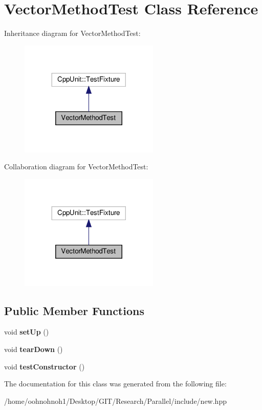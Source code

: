 \hypertarget{classVectorMethodTest}{}\section{Vector\+Method\+Test Class Reference}
\label{classVectorMethodTest}


Inheritance diagram for Vector\+Method\+Test\+:\nopagebreak
\begin{figure}[H]
\begin{center}
\leavevmode
\includegraphics[width=188pt]{classVectorMethodTest__inherit__graph}
\end{center}
\end{figure}


Collaboration diagram for Vector\+Method\+Test\+:\nopagebreak
\begin{figure}[H]
\begin{center}
\leavevmode
\includegraphics[width=188pt]{classVectorMethodTest__coll__graph}
\end{center}
\end{figure}
\subsection*{Public Member Functions}
\begin{DoxyCompactItemize}
\item 
\mbox{\label{classVectorMethodTest_a4ca09c1329683bb368b6bd28df840f23}} 
void {\bfseries set\+Up} ()
\item 
\mbox{\label{classVectorMethodTest_a9a758704660f646ed8dfbc913dcb69f7}} 
void {\bfseries tear\+Down} ()
\item 
\mbox{\label{classVectorMethodTest_aa81901684a9d920f34ebadfd0616c783}} 
void {\bfseries test\+Constructor} ()
\end{DoxyCompactItemize}


The documentation for this class was generated from the following file\+:\begin{DoxyCompactItemize}
\item 
/home/oohnohnoh1/\+Desktop/\+G\+I\+T/\+Research/\+Parallel/include/new.\+hpp\end{DoxyCompactItemize}
